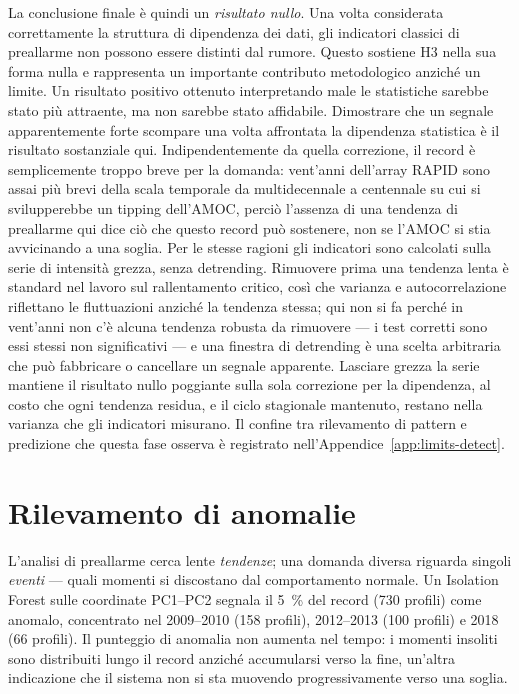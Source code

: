 La conclusione finale è quindi un \emph{risultato nullo}. Una volta considerata correttamente la struttura di dipendenza dei dati, gli indicatori classici di preallarme non possono essere distinti dal rumore. Questo sostiene H3 nella sua forma nulla e rappresenta un importante contributo metodologico anziché un limite. Un risultato positivo ottenuto interpretando male le statistiche sarebbe stato più attraente, ma non sarebbe stato affidabile. Dimostrare che un segnale apparentemente forte scompare una volta affrontata la dipendenza statistica è il risultato sostanziale qui. Indipendentemente da quella correzione, il record è semplicemente troppo breve per la domanda: vent'anni dell'array RAPID sono assai più brevi della scala temporale da multidecennale a centennale su cui si svilupperebbe un tipping dell'AMOC, perciò l'assenza di una tendenza di preallarme qui dice ciò che questo record può sostenere, non se l'AMOC si stia avvicinando a una soglia. Per le stesse ragioni gli indicatori sono calcolati sulla serie di intensità grezza, senza detrending. Rimuovere prima una tendenza lenta è standard nel lavoro sul rallentamento critico, così che varianza e autocorrelazione riflettano le fluttuazioni anziché la tendenza stessa; qui non si fa perché in vent'anni non c'è alcuna tendenza robusta da rimuovere --- i test corretti sono essi stessi non significativi --- e una finestra di detrending è una scelta arbitraria che può fabbricare o cancellare un segnale apparente. Lasciare grezza la serie mantiene il risultato nullo poggiante sulla sola correzione per la dipendenza, al costo che ogni tendenza residua, e il ciclo stagionale mantenuto, restano nella varianza che gli indicatori misurano. Il confine tra rilevamento di pattern e predizione che questa fase osserva è registrato nell'Appendice~\ref{app:limits-detect}.

\section{Rilevamento di anomalie}
\label{sec:detect-anomalies}

L'analisi di preallarme cerca lente \emph{tendenze}; una domanda diversa riguarda singoli \emph{eventi} --- quali momenti si discostano dal comportamento normale. Un Isolation Forest sulle coordinate PC1--PC2 segnala il \SI{5}{\percent} del record (730 profili) come anomalo, concentrato nel 2009--2010 (158 profili), 2012--2013 (100 profili) e 2018 (66 profili). Il punteggio di anomalia non aumenta nel tempo: i momenti insoliti sono distribuiti lungo il record anziché accumularsi verso la fine, un'altra indicazione che il sistema non si sta muovendo progressivamente verso una soglia.

